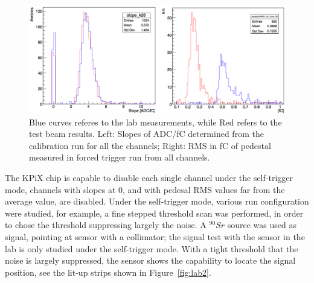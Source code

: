 \documentclass[conference]{IEEEtran}
\begin{document}
\begin{figure}[!ht]%
  \centering
  \includegraphics[width=1.0\linewidth]{pics/duo_pic.png}
  \caption{
  Blue curves referes to the lab measurements, while Red refers to the test beam results.
  Left: Slopes of ADC/fC determined from the calibration run for all the channels;
  Right: RMS in fC of pedestal measured in forced trigger run from all channels.}%
\label{fig:labtb}%
\end{figure}

The KPiX chip is capable to disable each single channel under the self-trigger mode,
channels with slopes at $0$, and with pedesal RMS values far from the average value, are disabled.
Under the self-trigger mode, various run configuration were studied,
for example, a fine stepped threshold scan was performed, in order to chose the threshold suppressing largely the noise.
A $^{90}Sr$ source was used as signal, pointing at sensor with a collimator;
the signal test with the sensor in the lab is only studied under the self-trigger mode.
With a tight threshold that the noise is largely suppressed, the sensor shows the capability to locate the signal position, see the lit-up strips shown in Figure~\ref{fig:lab2}.
\end{document}
